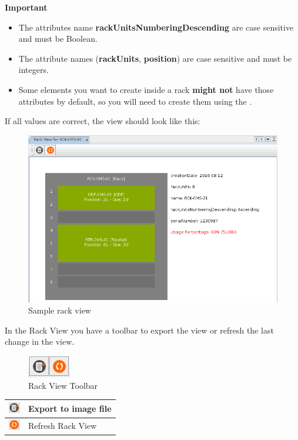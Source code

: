 \documentclass[a4paper]{article}
\begin{document}
		\begin{framed} {\large \textbf{Important}}
			\begin{itemize}
				\item The attributes name \textbf{rackUnitsNumberingDescending} are case sensitive and must be Boolean.
				\item The attribute names (\textbf{rackUnits}, \textbf{position}) are case sensitive and must be integers.
				\item Some elements you want to create inside a rack \textbf{might not} have those attributes by default, so you will need to create them using the .			
			\end{itemize}
		\end{framed}
		\newpage		
		If all values are correct, the view should look like this:
		\begin{figure}[h!]
			\centering
			\includegraphics[width=0.7\linewidth]{img/rack_view_sample_view.png}
			\caption{Sample rack view}
			\label{fig:rack_view_sample_view}
		\end{figure}

		In the Rack View you have a toolbar to export the view or refresh the last change in the view.
		
		\begin{figure}[h!]
			\centering
			\includegraphics[width=0.1\linewidth]{img/rack_view_toolbar.png}
			\caption{Rack View Toolbar}
			\label{fig:rack_view_toolbar}
		\end{figure}
		
		\begin{table}[h!]
			\centering
			\begin{tabular}[h!]{lp{10cm}}
				\includegraphics[width=0.5cm]{img/icon_export.png} & Export to image file\\
				\midrule
				\includegraphics[width=0.5cm]{img/icon_refresh_view.png} & Refresh Rack View\\
				\midrule
			\end{tabular}
		\end{table}
		
\end{document}
